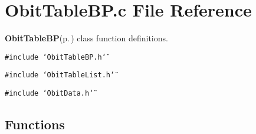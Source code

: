 \section{Obit\-Table\-BP.c File Reference}
\label{ObitTableBP_8c}
{\bf Obit\-Table\-BP}{\rm (p.\,\pageref{structObitTableBP})} class function definitions. 

{\tt \#include \char`\"{}Obit\-Table\-BP.h\char`\"{}}\par
{\tt \#include \char`\"{}Obit\-Table\-List.h\char`\"{}}\par
{\tt \#include \char`\"{}Obit\-Data.h\char`\"{}}\par
\subsection*{Functions}
